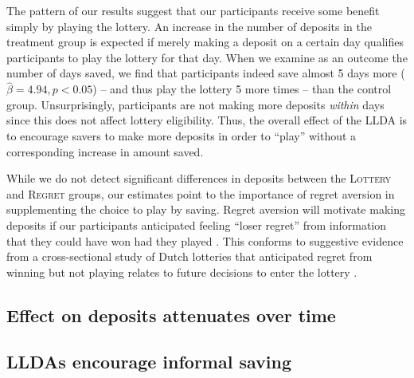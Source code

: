 \documentclass[12pt]{article}
\begin{document}

		The pattern of our results suggest that our participants receive some benefit simply by playing the lottery. An increase in the number of deposits in the treatment group is expected if merely making a deposit on a certain day qualifies participants to play the lottery for that day. When we examine as an outcome the number of days saved, we find that participants indeed save almost 5 days more ($\hat \beta = 4.94, p < 0.05$) -- and thus play the lottery 5 more times -- than the control group. Unsurprisingly, participants are not making more deposits \textit{within} days since this does not affect lottery eligibility. Thus, the overall effect of the LLDA is to encourage savers to make more deposits in order to ``play'' without a corresponding increase in amount saved. %


		While we do not detect significant differences in deposits between the \textsc{Lottery} and \textsc{Regret} groups, our estimates point to the importance of regret aversion in supplementing the choice to play by saving. Regret aversion will motivate making deposits if our participants anticipated feeling ``loser regret'' from information that they could have won had they played . This conforms to suggestive evidence from a cross-sectional study of Dutch lotteries that anticipated regret from winning but not playing relates to future decisions to enter the lottery .


	\subsection{Effect on deposits attenuates over time}

	\subsection{LLDAs encourage informal saving}
\end{document}
